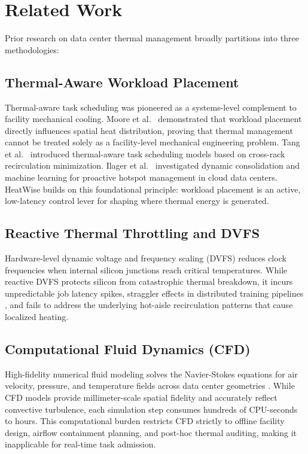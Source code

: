 \documentclass[conference,10pt]{IEEEtran}
\begin{document}
\section{Related Work}
\label{sec:related}
Prior research on data center thermal management broadly partitions into three methodologies:

\subsection{Thermal-Aware Workload Placement}
Thermal-aware task scheduling was pioneered as a systems-level complement to facility mechanical cooling. Moore et al.~\cite{moore2005temperature} demonstrated that workload placement directly influences spatial heat distribution, proving that thermal management cannot be treated solely as a facility-level mechanical engineering problem. Tang et al.~\cite{tang2008thermal} introduced thermal-aware task scheduling models based on cross-rack recirculation minimization. Ilager et al.~\cite{ilager2019etas, ilager2020thermal} investigated dynamic consolidation and machine learning for proactive hotspot management in cloud data centers. HeatWise builds on this foundational principle: workload placement is an active, low-latency control lever for shaping where thermal energy is generated.

\subsection{Reactive Thermal Throttling and DVFS}
Hardware-level dynamic voltage and frequency scaling (DVFS) reduces clock frequencies when internal silicon junctions reach critical temperatures. While reactive DVFS protects silicon from catastrophic thermal breakdown, it incurs unpredictable job latency spikes, straggler effects in distributed training pipelines \cite{xiao2018gandiva}, and fails to address the underlying hot-aisle recirculation patterns that cause localized heating.

\subsection{Computational Fluid Dynamics (CFD)}
High-fidelity numerical fluid modeling solves the Navier-Stokes equations for air velocity, pressure, and temperature fields across data center geometries \cite{choi2008cfd}. While CFD models provide millimeter-scale spatial fidelity and accurately reflect convective turbulence, each simulation step consumes hundreds of CPU-seconds to hours. This computational burden restricts CFD strictly to offline facility design, airflow containment planning, and post-hoc thermal auditing, making it inapplicable for real-time task admission.
\end{document}
